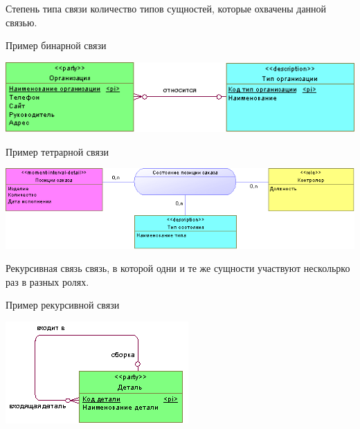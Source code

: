 \documentclass{beamer}
\begin{document}
\begin{frame}
\begin{block}{Степень типа связи}
количество типов сущностей, которые охвачены данной связью.
\end{block}
\begin{block}{Пример бинарной связи}
\begin{center}
\includegraphics[scale=0.5]{images/relation-03.png}
\end{center}
\end{block}
\begin{block}{Пример тетрарной связи}
\begin{center}
\includegraphics[scale=0.6]{images/relation-04.png}
\end{center}
\end{block}
\end{frame}

\begin{frame}
\begin{block}{Рекурсивная связь}
связь, в которой одни и те же сущности участвуют нескольрко раз в разных ролях.
\end{block}
\begin{block}{Пример рекурсивной связи}
\begin{center}
\includegraphics[scale=1.0]{images/self.png}
\end{center}
\end{block}
\end{frame}
\end{document}
